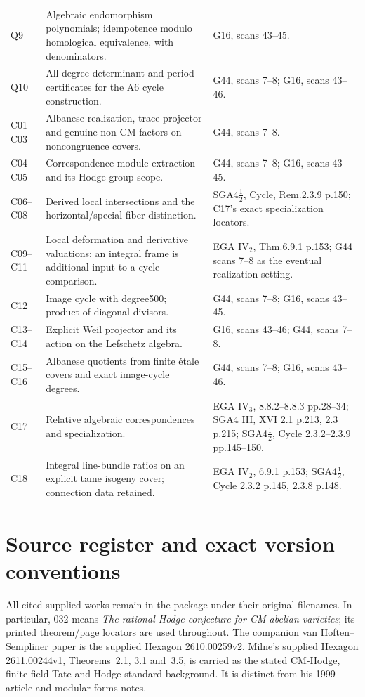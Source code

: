 \documentclass[11pt]{article}
\theoremstyle{definition}\newtheorem{definition}[theorem]{Definition}\newtheorem{remark}[theorem]{Remark}
\begin{document}
\begin{longtable}{@{}p{.18\linewidth}p{.48\linewidth}p{.27\linewidth}@{}}
Q9 & Algebraic endomorphism polynomials; idempotence modulo homological equivalence, with denominators. & G16, scans 43--45.\\
Q10 & All-degree determinant and period certificates for the A6 cycle construction. & G44, scans 7--8; G16, scans 43--46.\\
C01--C03 & Albanese realization, trace projector and genuine non-CM factors on noncongruence covers. & G44, scans 7--8.\\
C04--C05 & Correspondence-module extraction and its Hodge-group scope. & G44, scans 7--8; G16, scans 43--45.\\
C06--C08 & Derived local intersections and the horizontal/special-fiber distinction. & SGA4$\frac12$, Cycle, Rem.2.3.9 p.150; C17's exact specialization locators.\\
C09--C11 & Local deformation and derivative valuations; an integral frame is additional input to a cycle comparison. & EGA IV$_2$, Thm.6.9.1 p.153; G44 scans 7--8 as the eventual realization setting.\\
C12 & Image cycle with degree500; product of diagonal divisors. & G44, scans 7--8; G16, scans 43--45.\\
C13--C14 & Explicit Weil projector and its action on the Lefschetz algebra. & G16, scans 43--46; G44, scans 7--8.\\
C15--C16 & Albanese quotients from finite \'etale covers and exact image-cycle degrees. & G44, scans 7--8; G16, scans 43--46.\\
C17 & Relative algebraic correspondences and specialization. & EGA IV$_3$, 8.8.2--8.8.3 pp.28--34; SGA4 III, XVI 2.1 p.213, 2.3 p.215; SGA4$\frac12$, Cycle 2.3.2--2.3.9 pp.145--150.\\
C18 & Integral line-bundle ratios on an explicit tame isogeny cover; connection data retained. & EGA IV$_2$, 6.9.1 p.153; SGA4$\frac12$, Cycle 2.3.2 p.145, 2.3.8 p.148.\\
\bottomrule
\end{longtable}

\section{Source register and exact version conventions}

All cited supplied works remain in the package under their original
filenames. In particular, 032 means
\emph{The rational Hodge conjecture for CM abelian varieties}; its
printed theorem/page locators are used throughout. The companion
van Hoften--Sempliner paper is the supplied Hexagon 2610.00259v2.
Milne's supplied Hexagon 2611.00244v1, Theorems~2.1, 3.1 and~3.5,
is carried as the stated CM-Hodge, finite-field Tate and Hodge-standard
background. It is distinct from his 1999 article and modular-forms notes.
\end{document}
